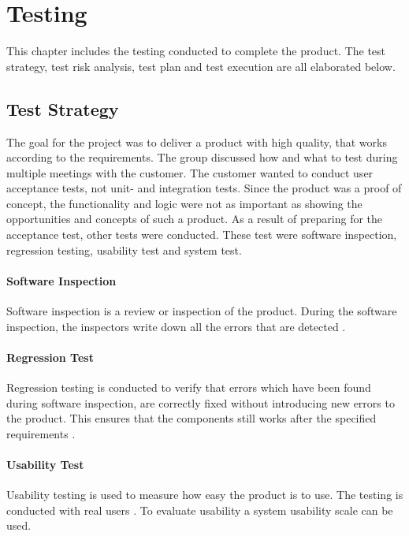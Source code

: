 
\chapter{Testing}
\label{Testing}
This chapter includes the testing conducted to complete the product. The test strategy, test risk analysis, test plan and test execution are all elaborated below. 


\section{Test Strategy}
The goal for the project was to deliver a product with high quality, that works according to the requirements. The group discussed how and what to test during multiple meetings with the customer. The customer wanted to conduct user acceptance tests, not unit- and integration tests. Since the product was a proof of concept, the functionality and logic were not as important as showing the opportunities and concepts of such a product. As a result of preparing for the acceptance test, other tests were conducted. These test were software inspection, regression testing, usability test and system test. 

\subsubsection{Software Inspection}
\label{software_inspection}
Software inspection is a review or inspection of the product. During the software inspection, the inspectors write down all the errors that are detected \cite{softwareInspection}.

\subsubsection{Regression Test}
\label{regression_test}
Regression testing is conducted to verify that errors which have been found during software inspection, are correctly fixed without introducing new errors to the product. This ensures that the components still works after the specified requirements \cite{regressionTest}.

\subsubsection{Usability Test}
Usability testing is used to measure how easy the product is to use. The testing is conducted with real users \cite{usabiliyTest}. To evaluate usability a system usability scale can be used.

